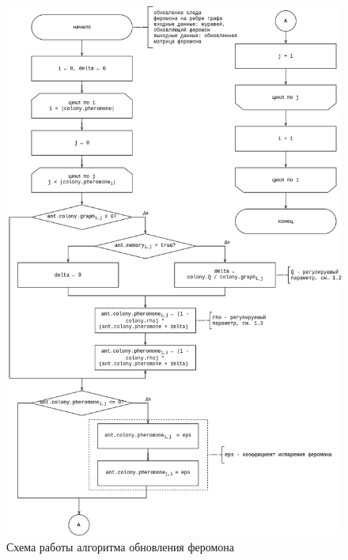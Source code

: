       \begin{center}
    \begin{figure}[!h]
        \centering
        \includegraphics[width=0.8\linewidth]{img/tsp-phero.drawio.png}
        \caption{Схема работы алгоритма обновления феромона}
        \label{fig:ant-phero}
    \end{figure}
\end{center}
\newpage


